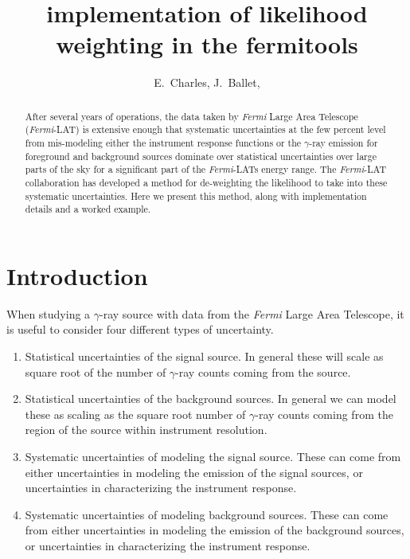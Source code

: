 \documentclass[preprint]{aastex}
\begin{document}
%
\title{implementation of likelihood weighting in the fermitools}

\author{ 
E.~Charles, 
J.~Ballet, 
}


\begin{abstract}
  After several years of operations, the data taken by {\it Fermi} Large Area Telescope ({\it Fermi}-LAT) is extensive
  enough that systematic uncertainties at the few percent level from mis-modeling either the instrument response functions
  or the $\gamma$-ray emission for foreground and background sources dominate over statistical uncertainties
  over large parts of the sky for a significant part of the {\it Fermi}-LATs energy range.   The {\it Fermi}-LAT
  collaboration has developed a method for de-weighting the likelihood to take into these systematic uncertainties.
  Here we present this method, along with implementation details and a worked example.
\end{abstract}

\maketitle

\section{Introduction}

When studying a $\gamma$-ray source with data from the {\it Fermi} Large Area Telescope, 
it is useful to consider four different types of uncertainty.  

\begin{enumerate}
\item{Statistical uncertainties of the signal source.  In general these will scale as square root
    of the number of $\gamma$-ray counts coming from the source.}
\item{Statistical uncertainties of the background sources.  In general we can model these as
    scaling as the square root number of $\gamma$-ray counts coming from the region of the source 
    within instrument resolution.}
\item{Systematic uncertainties of modeling the signal source.  These can come from either
    uncertainties in modeling the emission of the signal sources, or uncertainties in 
    characterizing the instrument response.}
\item{Systematic uncertainties of modeling background sources.  These can come from either
    uncertainties in modeling the emission of the background sources, or uncertainties in 
    characterizing the instrument response.}
\end{enumerate}
\end{document}
